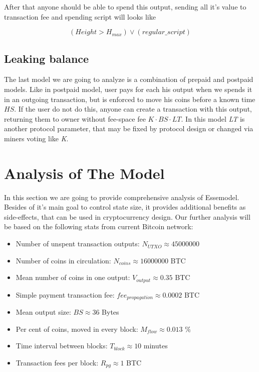 \documentclass[]{article}   %
\newcommand{\esse}{Esse}
\begin{document}
After that anyone should be able to spend this output, sending all it's value to transaction fee and spending script will looks like

\begin{equation}
(Height > H_{max}) \lor (regular\_script)
\end{equation}

\subsection{Leaking balance}

The last model we are going to analyze is a combination of prepaid and postpaid models. Like in postpaid model, user pays for each his output when we spends it in an outgoing transaction, but is enforced to move his coins before a known time \textit{$HS$}. If the user do not do this, anyone can create a transaction with this output, returning them to owner without fee-space fee ${K \cdot BS \cdot LT}$. In this model \textit{LT} is another protocol parameter, that may be fixed by protocol design or changed via miners voting like \textit{K}.

\section{Analysis of The Model}
\label{sec:analysis}

In this section we are going to provide comprehensive analysis of \esse model. Besides of it's main goal to control state size, it provides additional benefits as side-effects, that can be used in cryptocurrency design. Our further analysis will be based on the following stats from current Bitcoin network:

\begin{itemize}
  \item Number of unspent transaction outputs: $N_{UTXO} \approx 45000000$
  \item Number of coins in circulation: $N_{coins} \approx 16000000$ BTC
  \item Mean number of coins in one output: $V_{output} \approx 0.35$ BTC
  \item Simple payment transaction fee: $fee_{propagation} \approx 0.0002$ BTC
  \item Mean output size: $BS \approx 36$ Bytes
  \item Per cent of coins, moved in every block: $M_{flow} \approx 0.013$ \%
  \item Time interval between blocks: $T_{block} \approx 10$ minutes
  \item Transaction fees per block: $R_{pg} \approx 1$ BTC
\end{itemize}
\end{document}
